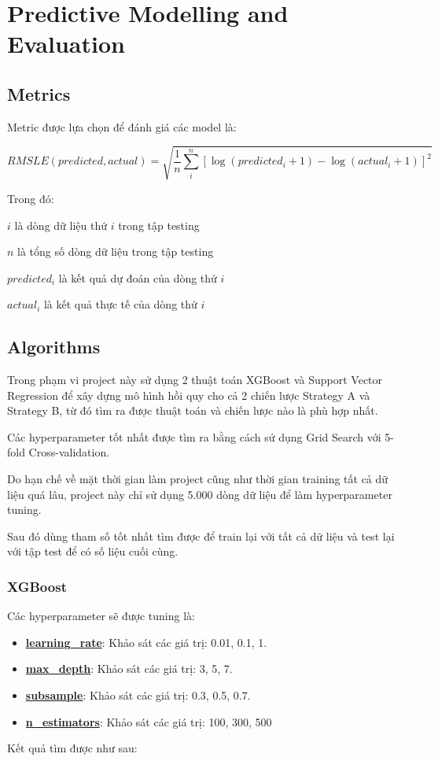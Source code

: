 \chapter{Predictive Modelling and Evaluation}

\section{Metrics}

Metric được lựa chọn để đánh giá các model là:

$$RMSLE(predicted, actual) = \sqrt{\frac{1}{n}\sum_{i}^{n}[\log(predicted_{i} + 1) - \log(actual_{i} + 1)]^{2}}$$

Trong đó:

$i$ là dòng dữ liệu thứ $i$ trong tập testing

$n$ là tổng số dòng dữ liệu trong tập testing

$predicted_{i}$ là kết quả dự đoán của dòng thứ $i$

$actual_{i}$ là kết quả thực tế của dòng thứ $i$

\section{Algorithms}

Trong phạm vi project này sử dụng 2 thuật toán XGBoost và Support Vector Regression để xây dựng mô hình hồi quy cho cả 2 chiến lược Strategy A và Strategy B, từ đó tìm ra được thuật toán và chiến lược nào là phù hợp nhất.

Các hyperparameter tốt nhất được tìm ra bằng cách sử dụng Grid Search với 5-fold Cross-validation. 

Do hạn chế về mặt thời gian làm project cũng như thời gian training tất cả dữ liệu quá lâu, project này chỉ sử dụng 5.000 dòng dữ liệu để làm hyperparameter tuning.

Sau đó dùng tham số tốt nhất tìm được để train lại với tất cả dữ liệu và test lại với tập test để có số liệu cuối cùng.

\subsection{XGBoost}

Các hyperparameter sẽ được tuning là:

\begin{itemize}
\item \textbf{\underline{learning\_rate}}: Khảo sát các giá trị: 0.01, 0.1, 1.

\item \textbf{\underline{max\_depth}}: Khảo sát các giá trị: 3, 5, 7.

\item \textbf{\underline{subsample}}: Khảo sát các giá trị: 0.3, 0.5, 0.7.

\item \textbf{\underline{n\_estimators}}: Khảo sát các giá trị: 100, 300, 500
\end{itemize}
Kết quả tìm được như sau:

